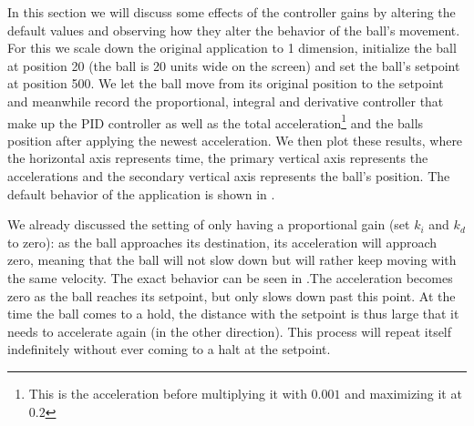 In this section we will discuss some effects of the controller gains by altering the default values and observing how they alter the behavior of the ball's movement. For this we scale down the original application to 1 dimension, initialize the ball at position 20 (the ball is 20 units wide on the screen) and set the ball's setpoint at position 500. We let the ball move from its original position to the setpoint and meanwhile record the proportional, integral and derivative controller that make up the PID controller as well as the total acceleration\footnote{This is the acceleration before multiplying it with $0.001$ and maximizing it at $0.2$} and the balls position after applying the newest acceleration. We then plot these results, where the horizontal axis represents time, the primary vertical axis represents the accelerations and the secondary vertical axis represents the ball's position. The default behavior of the application is shown in .

We already discussed the setting of only having a proportional gain (set $k_i$ and $k_d$ to zero): as the ball approaches its destination, its acceleration will approach zero, meaning that the ball will not slow down but will rather keep moving with the same velocity. The exact behavior can be seen in .The acceleration becomes zero as the ball reaches its setpoint, but only slows down past this point. At the time the ball comes to a hold, the distance with the setpoint is thus large that it needs to accelerate again (in the other direction). This process will repeat itself indefinitely without ever coming to a halt at the setpoint.

